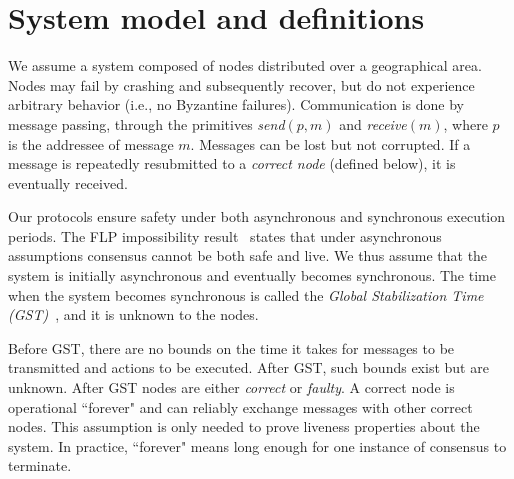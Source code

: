 \documentclass[times, 10pt]{article}
\begin{document}
\section{System model and definitions}
\label{sec:model}

We assume a system composed of nodes distributed over a geographical area. Nodes may fail by crashing and subsequently recover, but do not experience arbitrary behavior (i.e., no Byzantine failures). Communication is done by message passing, through the primitives \emph{send}$(p,m)$ and \emph{receive}$(m)$, where $p$ is the addressee of message $m$. Messages can be lost but not corrupted. If a message is repeatedly resubmitted to a \emph{correct node} (defined below), it is eventually received.

Our protocols ensure safety under both asynchronous and synchronous execution periods. The FLP impossibility result~\cite{fischer1985idc} states that under asynchronous assumptions consensus cannot be both safe and live. We thus assume that the system is initially asynchronous and eventually becomes synchronous. The time when the system becomes synchronous is called the \emph{Global Stabilization Time (GST)}~\cite{dwork1988cpp}, and it is unknown to the nodes.

Before GST, there are no bounds on the time it takes for messages to be transmitted and actions to be executed. After GST, such bounds exist but are unknown. After GST nodes are either \emph{correct} or \emph{faulty}. A correct node is operational ``forever" and can reliably exchange messages with other correct nodes. This assumption is only needed to prove liveness properties about the system. In practice, ``forever" means long enough for one instance of consensus to terminate.

\end{document}
